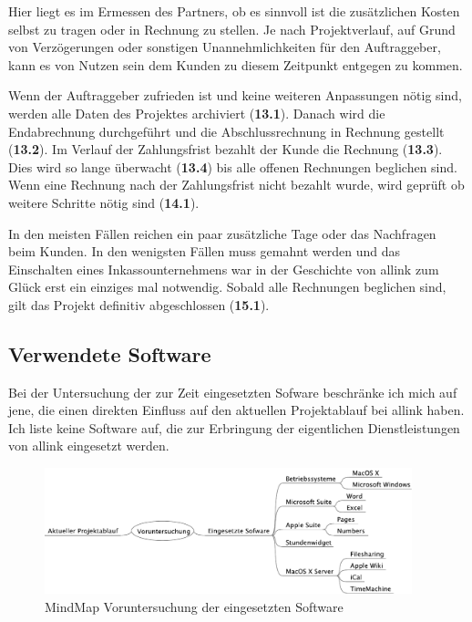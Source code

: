 Hier liegt es im Ermessen des Partners, ob es sinnvoll ist die zusätzlichen Kosten 
selbst zu tragen oder in Rechnung zu stellen. Je nach Projektverlauf, auf Grund von
Verzögerungen oder sonstigen Unannehmlichkeiten für den Auftraggeber, kann es
von Nutzen sein dem Kunden zu diesem Zeitpunkt entgegen zu kommen.

Wenn der Auftraggeber zufrieden ist und keine weiteren Anpassungen nötig sind, 
werden alle Daten des Projektes archiviert (\textbf{13.1}). Danach wird die
Endabrechnung durchgeführt und die Abschlussrechnung in Rechnung gestellt (\textbf{13.2}).
Im Verlauf der Zahlungsfrist bezahlt der Kunde die Rechnung (\textbf{13.3}).
Dies wird so lange überwacht (\textbf{13.4}) bis alle offenen Rechnungen beglichen
sind. Wenn eine Rechnung nach der Zahlungsfrist nicht bezahlt wurde, wird
geprüft ob weitere Schritte nötig sind (\textbf{14.1}).

In den meisten Fällen reichen ein paar zusätzliche Tage oder das Nachfragen beim 
Kunden. In den wenigsten Fällen muss gemahnt werden und das Einschalten eines 
Inkassounternehmens war in der Geschichte von allink zum Glück erst ein einziges 
mal notwendig. Sobald alle Rechnungen beglichen sind, gilt das Projekt definitiv 
abgeschlossen (\textbf{15.1}).

\subsection{Verwendete Software}
Bei der Untersuchung der zur Zeit eingesetzten Sofware beschränke ich mich auf jene,
die einen direkten Einfluss auf den aktuellen Projektablauf bei allink haben.
Ich liste keine Software auf, die zur Erbringung der eigentlichen Dienstleistungen
von allink eingesetzt werden.

\begin{figure}[htbp]
\begin{center}
\includegraphics[width=0.95\textwidth,angle=0]{./bilder/analyse/mindmaps/voruntersuchung_software.pdf}
\caption{MindMap Voruntersuchung der eingesetzten Software}
\label{pic:voruntersuchung_software}
\end{center}
\end{figure}

